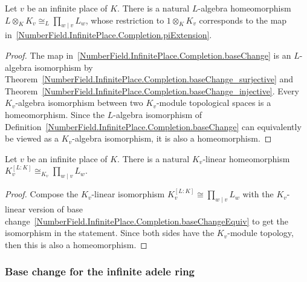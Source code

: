 \begin{theorem}
  \label{NumberField.InfinitePlace.Completion.baseChangeEquiv}
  \leanok
  Let $v$ be an infinite place of $K$. There is a natural $L$-algebra homeomorphism
  $L\otimes_K K_v \cong_L \prod_{w\mid v}L_w$, whose restriction to $1\otimes_K K_v$ corresponds to
  the map in~\ref{NumberField.InfinitePlace.Completion.piExtension}.
\end{theorem}
\begin{proof}
  The map in~\ref{NumberField.InfinitePlace.Completion.baseChange} is an $L$-algebra
  isomorphism by Theorem~\ref{NumberField.InfinitePlace.Completion.baseChange_surjective}
  and Theorem~\ref{NumberField.InfinitePlace.Completion.baseChange_injective}.
  Every $K_v$-algebra isomorphism between two $K_v$-module topological spaces is a homeomorphism.
  Since the $L$-algebra isomorphism of
  Definition~\ref{NumberField.InfinitePlace.Completion.baseChange} can equivalently be viewed as
  a $K_v$-algebra isomorphism, it is also a homeomorphism.
\end{proof}

\begin{theorem}
  \label{NumberField.InfinitePlace.Completion.piEquiv}
  \leanok
  Let $v$ be an infinite place of $K$. There is a natural $K_v$-linear homeomorphism
  $K_v^{[L:K]} \cong_{K_v} \prod_{w\mid v}L_w$.
\end{theorem}
\begin{proof}
  Compose the $K_v$-linear isomorphism $K_v^{[L:K]} \cong \prod_{w\mid v}L_w$ with the $K_v$-linear
  version of base change~\ref{NumberField.InfinitePlace.Completion.baseChangeEquiv} to get the
  isomorphism in the statement.
  Since both sides have the $K_v$-module topology, then this is also a homeomorphism.
\end{proof}

\subsubsection{Base change for the infinite adele ring}


